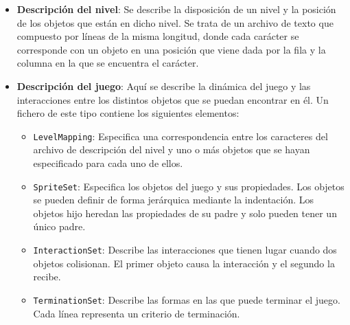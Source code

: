\begin{itemize}
    \item \textbf{Descripción del nivel}: Se describe la disposición
    de un nivel y la posición de los objetos que están en dicho nivel. Se trata
    de un archivo de texto que compuesto por líneas de la misma longitud, donde
    cada carácter se corresponde con un objeto en una posición que viene dada por la fila
    y la columna en la que se encuentra el carácter.
    \item \textbf{Descripción del juego}: Aquí se describe la dinámica del juego y las
    interacciones entre los distintos objetos que se puedan encontrar en él. Un fichero
    de este tipo contiene los siguientes elementos:
    \begin{itemize}
        \item \texttt{LevelMapping}: Especifica una correspondencia entre los caracteres del archivo
        de descripción del nivel y uno o más objetos que se hayan especificado para cada uno de ellos.
        \item \texttt{SpriteSet}: Especifica los objetos del juego y sus propiedades. Los objetos
        se pueden definir de forma jerárquica mediante la indentación. Los objetos hijo heredan las propiedades
        de su padre y solo pueden tener un único padre.
        \item \texttt{InteractionSet}: Describe las interacciones que tienen lugar cuando dos objetos
        colisionan. El primer objeto causa la interacción y el segundo la recibe.
        \item \texttt{TerminationSet}: Describe las formas en las que puede terminar el juego. Cada
        línea representa un criterio de terminación.
    \end{itemize}
\end{itemize}

